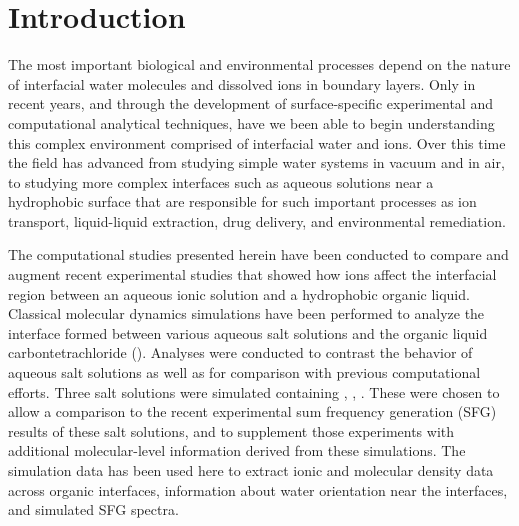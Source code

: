 \section{Introduction}

The most important biological and environmental processes depend on the nature of interfacial water molecules and dissolved ions in boundary layers. Only in recent years, and through the development of surface-specific experimental\cite{Charreteur2008,Chen2007,Luo2006} and computational\cite{Schnell2004,Wardle2005,Wick2008a} analytical techniques, have we been able to begin understanding this complex environment comprised of interfacial water and ions. Over this time the field has advanced from studying simple water systems in vacuum and in air, to studying more complex interfaces such as aqueous solutions near a hydrophobic surface that are responsible for such important processes as ion transport, liquid-liquid extraction, drug delivery, and environmental remediation. 

The computational studies presented herein have been conducted to compare and augment recent experimental studies that showed how ions affect the interfacial region between an aqueous ionic solution and a hydrophobic organic liquid.\cite{McFearin2009} Classical molecular dynamics simulations have been performed to analyze the interface formed between various aqueous salt solutions and the organic liquid carbontetrachloride (\ctc). Analyses were conducted to contrast the behavior of aqueous salt solutions as well as for comparison with previous computational efforts.\cite{Hore2007,Hore2008,Hore2007a,Walker2006b,Walker2007a,Walker2007b}  Three salt solutions were simulated containing \nacl, \sodnit, \sodsul. These were chosen to allow a comparison to the recent experimental sum frequency generation (SFG) results of these salt solutions,\cite{McFearin2009} and to supplement those experiments with additional molecular-level information derived from these simulations. The simulation data has been used here to extract ionic and molecular density data across organic interfaces, information about water orientation near the interfaces, and simulated SFG spectra. 



